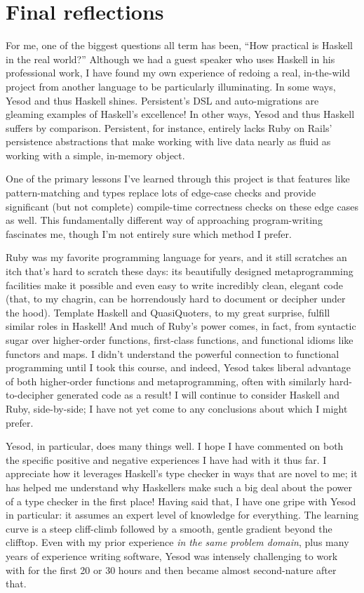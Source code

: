 \section{Final reflections}

For me, one of the biggest questions all term has been, ``How practical is Haskell in the real world?'' Although we had a guest speaker who uses Haskell in his professional work, I have found my own experience of redoing a real, in-the-wild project from another language to be particularly illuminating. In some ways, Yesod and thus Haskell shines. Persistent's DSL and auto-migrations are gleaming examples of Haskell's excellence! In other ways, Yesod and thus Haskell suffers by comparison. Persistent, for instance, entirely lacks Ruby on Rails' persistence abstractions that make working with live data nearly as fluid as working with a simple, in-memory object.

One of the primary lessons I've learned through this project is that features like pattern-matching and  types replace lots of edge-case checks and provide significant (but not complete) compile-time correctness checks on these edge cases as well. This fundamentally different way of approaching program-writing fascinates me, though I'm not entirely sure which method I prefer.

Ruby was my favorite programming language for years, and it still scratches an itch that's hard to scratch these days: its beautifully designed metaprogramming facilities make it possible and even easy to write incredibly clean, elegant code (that, to my chagrin, can be horrendously hard to document or decipher under the hood). Template Haskell and QuasiQuoters, to my great surprise, fulfill similar roles in Haskell! And much of Ruby's power comes, in fact, from syntactic sugar over higher-order functions, first-class functions, and functional idioms like functors and maps. I didn't understand the powerful connection to functional programming until I took this course, and indeed, Yesod takes liberal advantage of both higher-order functions and metaprogramming, often with similarly hard-to-decipher generated code as a result! I will continue to consider Haskell and Ruby, side-by-side; I have not yet come to any conclusions about which I might prefer.

Yesod, in particular, does many things well. I hope I have commented on both the specific positive and negative experiences I have had with it thus far. I appreciate how it leverages Haskell's type checker in ways that are novel to me; it has helped me understand why Haskellers make such a big deal about the power of a type checker in the first place! Having said that, I have one gripe with Yesod in particular: it assumes an expert level of knowledge for everything. The learning curve is a steep cliff-climb followed by a smooth, gentle gradient beyond the clifftop. Even with my prior experience \emph{in the same problem domain}, plus many years of experience writing software, Yesod was intensely challenging to work with for the first 20 or 30 hours and then became almost second-nature after that.

